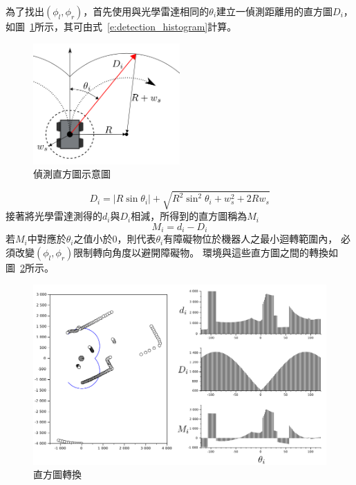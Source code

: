 為了找出$(\phi_l,\phi_r)$，首先使用與光學雷達相同的$\theta_i$建立一偵測距離用的直方圖$D_i$，
如圖~\ref{f:detection_histogram}所示，其可由式~\ref{e:detection_histogram}計算。
\begin{figure}[h!]
	\centering
	\includegraphics[width=0.5\textwidth]{figures/detection_histogram}
	\caption{偵測直方圖示意圖}
	\label{f:detection_histogram}
\end{figure}
\begin{equation}
	D_i = |R\sin\theta_i| + \sqrt{R^2\sin^2\theta_i + w_s^2 + 2Rw_s}
	\label{e:detection_histogram}
\end{equation}
接著將光學雷達測得的$d_i$與$D_i$相減，所得到的直方圖稱為$M_i$
\begin{equation}
	M_i = d_i - D_i
\end{equation}
若$M_i$中對應於$\theta_i$之值小於$0$，則代表$\theta_i$有障礙物位於機器人之最小迴轉範圍內，
必須改變$(\phi_l,\phi_r)$限制轉向角度以避開障礙物。
環境與這些直方圖之間的轉換如圖~\ref{f:histogram_transform}所示。
\begin{figure}[h!]
	\centering
	\includegraphics[width=\textwidth]{figures/histogram_transform}
	\caption{直方圖轉換}
	\label{f:histogram_transform}
\end{figure}

